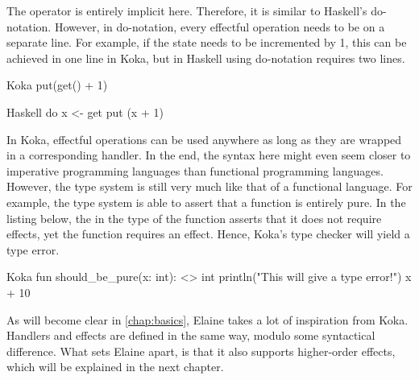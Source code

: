 The \hs{>>=} operator is entirely implicit here. Therefore, it is similar to Haskell's do-notation. However, in do-notation, every effectful operation needs to be on a separate line. For example, if the state needs to be incremented by 1, this can be achieved in one line in Koka, but in Haskell using do-notation requires two lines.

\begin{lst}{Koka}
put(get() + 1)
\end{lst}
\begin{lst}{Haskell}
do
  x <- get
  put (x + 1)
\end{lst}

In Koka, effectful operations can be used anywhere as long as they are wrapped in a corresponding handler. In the end, the syntax here might even seem closer to imperative programming languages than functional programming languages. However, the type system is still very much like that of a functional language. For example, the type system is able to assert that a function is entirely pure. In the listing below, the \hs{<>} in the type of the function asserts that it does not require effects, yet the  function requires an effect. Hence, Koka's type checker will yield a type error.

\begin{lst}{Koka}
fun should_be_pure(x: int): <> int
  println("This will give a type error!")
  x + 10
\end{lst}

As will become clear in \cref{chap:basics}, Elaine takes a lot of inspiration from Koka. Handlers and effects are defined in the same way, modulo some syntactical difference. What sets Elaine apart, is that it also supports higher-order effects, which will be explained in the next chapter.

